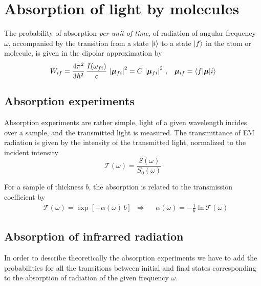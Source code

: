 \chapter{Absorption of light by molecules}
\label{C:light-absorpt-molec}

The probability of absorption \emph{per unit of time}, of radiation of angular frequency $\omega$, accompanied by the transition from a state $\left| i \right\rangle$ to a state $\left| f \right\rangle$ in the atom or molecule, is given in the dipolar approximation by
\begin{align}\label{Q:Wif-absorc-dipol}
  W_{if} &= \frac{4 \pi^{2}}{3 \hbar^{2}}\,\frac{I(\omega_{fi})}{c}\, \left| \bm{\mu}_{fi} \right|^{2} = C\, \left| \bm{\mu}_{fi} \right|^{2} \,, & \bm{\mu}_{if}= \left\langle f | \bm{\mu} | i \right\rangle
\end{align}

\section{Absorption experiments}
\label{S:absorpt-experim}

Absorption experiments are rather simple, light of a given wavelength incides over a sample, and the transmitted light is measured. 
The transmittance of EM radiation is given by the intensity of the transmitted light, normalized to the incident intensity 
%
\begin{equation}  \label{Q:def-transmitancia}
  \mathcal{T}(\omega) = \frac{S(\omega)}{S_{0}(\omega)}
\end{equation}

For a sample of thickness $b$, the absorption is related to the transmission coefficient by
\begin{align}
  \label{Q:def-absorbancia}
  &\mathcal{T}(\omega) = \exp{\left[- \alpha(\omega)\,b \right]} & \Rightarrow &  & \alpha(\omega) = -\frac{1}{b} \ln{\mathcal{T}(\omega)}
\end{align}


\section{Absorption of infrarred radiation}
\label{S:absorpt-infr-radi}

In order to describe theoretically the absorption experiments we have to add the probabilities for all the transitions between initial and final states corresponding to the absorption of 
radiation of the given frequency $\omega$.

